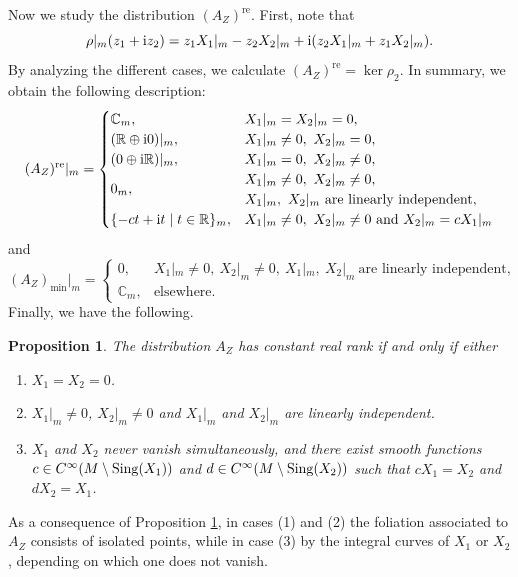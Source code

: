 \documentclass[pdftex]{sigma}
\numberwithin{equation}{section}
\newtheorem{Proposition}[Theorem]{Proposition}
 { \theoremstyle{definition}
\newtheorem{Definition}[Theorem]{Definition}
\newtheorem{Note}[Theorem]{Note}
\newtheorem{Example}[Theorem]{Example}
\newtheorem{Examples}[Theorem]{Examples}
\newtheorem{Remark}[Theorem]{Remark} }
\newcommand{\R}{{\mathbb{R}}}
\newcommand{\C}{{\mathbb{C}}}
\DeclareMathOperator{\real}{re}
\begin{document}
Now we study the distribution $(A_Z)^{\real}$. First, note that
\[\rho|_m(z_1+{\rm i}z_2)=z_1 X_1|_m - z_2 X_2|_m + {\rm i}(z_2 X_1|_m + z_1 X_2|_m).\]
By analyzing the different cases, we calculate $(A_Z)^{\real}=\ker\rho_2$. In summary, we obtain the following description:
\[
(A_Z)^{\real}|_m=
\begin{cases}
\C_m, & X_1|_m=X_2|_m=0,\\
(\R\oplus {\rm i}0)|_m, & X_1|_m\neq 0, \ X_2|_m=0,\\
(0\oplus {\rm i}\R)|_m, & X_1|_m=0, \ X_2|_m\neq 0,\\
0_m, & \begin{array}{@{}l@{}} X_1|_m\neq 0, \ X_2|_m\neq 0,\\
    X_1|_m, \  X_2|_m\ \text{are linearly independent},\end{array}\\
\{-ct+{\rm i}t\mid t\in \R\}_m,& X_1|_m\neq 0, \ X_2|_m\neq0\ \text{and}\ X_2|_m=cX_1|_m
\end{cases}
\]
and
\[
(A_Z)_{\min}|_m=
\begin{cases}
0, & X_1|_m\neq 0,\  X_2|_m\neq 0,\  X_1|_m, \ X_2|_m\ \text{are linearly independent},\\
\C_m,& \text{elsewhere}.
\end{cases}
\]
Finally, we have the following.
\begin{Proposition}\label{cxvf}
The distribution $A_Z$ has constant real rank if and only if either
\begin{enumerate}\itemsep=0pt
  \item[$1.$] $X_1=X_2=0$.
  \item[$2.$] $X_1|_m\neq 0$, $X_2|_m\neq 0$ and $X_1|_m$ and $X_2|_m$ are linearly independent.
   \item[$3.$] $X_1$ and $X_2$ never vanish simultaneously, and there exist smooth functions $c\in C^{\infty}(M\setminus {\rm Sing}(X_1))$ and $d\in C^{\infty}(M\setminus {\rm Sing}(X_2))$ such that $c X_1=X_2$ and $d X_2=X_1$.
\end{enumerate}
\end{Proposition}
As a consequence of Proposition \ref{cxvf}, in cases (1) and (2) the foliation associated to $A_Z$ consists of isolated points, while in case (3) by the integral curves of $X_1$ or $X_2$, depending on which one does not vanish.
\end{document}
